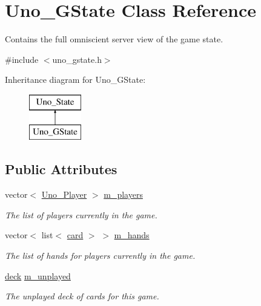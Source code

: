 \hypertarget{class_uno___g_state}{
\section{\-Uno\-\_\-\-G\-State \-Class \-Reference}
\label{class_uno___g_state}
}


\-Contains the full omniscient server view of the game state.  




{\ttfamily \#include $<$uno\-\_\-gstate.\-h$>$}

\-Inheritance diagram for \-Uno\-\_\-\-G\-State\-:\begin{figure}[H]
\begin{center}
\leavevmode
\includegraphics[height=2.000000cm]{class_uno___g_state}
\end{center}
\end{figure}
\subsection*{\-Public \-Attributes}
\begin{DoxyCompactItemize}
\item 
\hypertarget{class_uno___g_state_acf0593a856c85059d8bd6bc71ee3165c}{
vector$<$ \hyperlink{class_uno___player}{\-Uno\-\_\-\-Player} $>$ \hyperlink{class_uno___g_state_acf0593a856c85059d8bd6bc71ee3165c}{m\-\_\-players}}
\label{class_uno___g_state_acf0593a856c85059d8bd6bc71ee3165c}

\begin{DoxyCompactList}\small\item\em \-The list of players currently in the game. \end{DoxyCompactList}\item 
\hypertarget{class_uno___g_state_a684bf43892cc1477cf54943c8eb092a6}{
vector$<$ list$<$ \hyperlink{uno__card_8h_ab16a632e2e3f1f154cce75648902eb83}{card} $>$ $>$ \hyperlink{class_uno___g_state_a684bf43892cc1477cf54943c8eb092a6}{m\-\_\-hands}}
\label{class_uno___g_state_a684bf43892cc1477cf54943c8eb092a6}

\begin{DoxyCompactList}\small\item\em \-The list of hands for players currently in the game. \end{DoxyCompactList}\item 
\hyperlink{uno__deck_8h_ab634a15f4d19d3af113a71241b79c408}{deck} \hyperlink{class_uno___g_state_afcc8256ce8ae779aa3e529f33a8818c1}{m\-\_\-unplayed}
\begin{DoxyCompactList}\small\item\em \-The unplayed deck of cards for this game. \end{DoxyCompactList}\end{DoxyCompactItemize}



